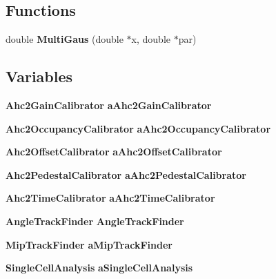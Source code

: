 \subsection*{Functions}
\begin{DoxyCompactItemize}
\item 
double {\bfseries Multi\-Gaus} (double $\ast$x, double $\ast$par)\label{namespaceCALICE_ab027e03d90dee39729ce0c0ff8524bfb}

\end{DoxyCompactItemize}
\subsection*{Variables}
\begin{DoxyCompactItemize}
\item 
{\bf Ahc2\-Gain\-Calibrator} {\bfseries a\-Ahc2\-Gain\-Calibrator}\label{namespaceCALICE_aff0f779ea231c17c5f3447d5f1c85c5a}

\item 
{\bf Ahc2\-Occupancy\-Calibrator} {\bfseries a\-Ahc2\-Occupancy\-Calibrator}\label{namespaceCALICE_a7fe4999af74e4f9efd68e87610fbb98f}

\item 
{\bf Ahc2\-Offset\-Calibrator} {\bfseries a\-Ahc2\-Offset\-Calibrator}\label{namespaceCALICE_a0dfd57d58d988a974ce3c87364e65fc1}

\item 
{\bf Ahc2\-Pedestal\-Calibrator} {\bfseries a\-Ahc2\-Pedestal\-Calibrator}\label{namespaceCALICE_abe03f653dfffe06ae6550343edbbb184}

\item 
{\bf Ahc2\-Time\-Calibrator} {\bfseries a\-Ahc2\-Time\-Calibrator}\label{namespaceCALICE_abbba19a7f1d435b2a027e1d909e983df}

\item 
{\bf Angle\-Track\-Finder} {\bfseries Angle\-Track\-Finder}\label{namespaceCALICE_a3a6925ca17e1f05cc97e625f7edd5ed5}

\item 
{\bf Mip\-Track\-Finder} {\bfseries a\-Mip\-Track\-Finder}\label{namespaceCALICE_a63db13b96d3be485b4c57ba60db44bdd}

\item 
{\bf Single\-Cell\-Analysis} {\bfseries a\-Single\-Cell\-Analysis}\label{namespaceCALICE_a0c491b351d33b91639df2101f7725139}

\end{DoxyCompactItemize}


